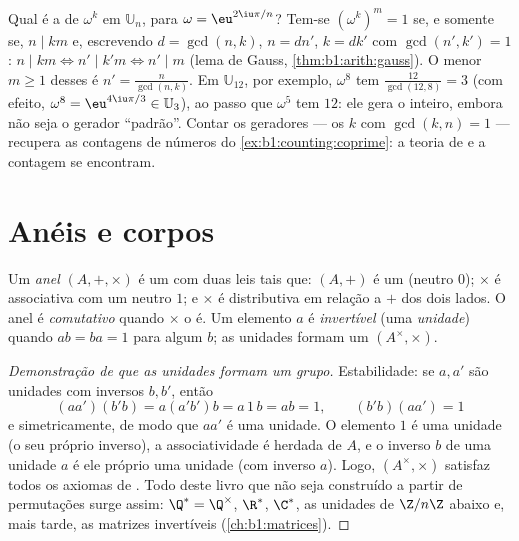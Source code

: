 \begin{example}\label{ex:b1:structures:orderU12}
Qual é a  de $\omega^k$ em $\mathbb U_n$, para $\omega =
\eu^{2\iu\pi/n}$? Tem-se $(\omega^k)^m = 1$ se, e somente se, $n \mid km$ e,
escrevendo $d = \gcd(n, k)$, $n = dn'$, $k = dk'$ com $\gcd(n', k')
= 1$: $n \mid km \iff n' \mid k'm \iff n' \mid m$ (lema de Gauss,
\cref{thm:b1:arith:gauss}). O menor $m \geq 1$ desses é
$n' = \frac{n}{\gcd(n,k)}$. Em $\mathbb U_{12}$, por exemplo,
$\omega^8$ tem  $\frac{12}{\gcd(12,8)} = 3$ (com efeito,
$\omega^8 = \eu^{4\iu\pi/3} \in \mathbb U_3$), ao passo que $\omega^5$
tem  $12$: ele gera o  inteiro, embora não seja
o gerador ``padrão''. Contar os geradores --- os $k$
com $\gcd(k, n) = 1$ --- recupera as contagens de números  do \cref{ex:b1:counting:coprime}: a teoria de  e a contagem se encontram.
\end{example}

\section{Anéis e corpos}

\begin{definition}[Anel]\label{def:b1:structures:ring}
Um \emph{anel} $(A, +, \times)$ é um  com duas leis tais
que: $(A, +)$ é um  (neutro $0$); $\times$ é
associativa com um neutro $1$; e $\times$ é distributiva em relação a $+$
dos dois lados. O anel é \emph{comutativo} quando $\times$ o é. Um
elemento $a$ é \emph{invertível} (uma \emph{unidade}) quando $ab = ba = 1$
para algum $b$; as unidades formam um  $(A^\times, \times)$.
\end{definition}

\begin{proof}[Demonstração de que as unidades formam um grupo]
Estabilidade: se $a, a'$ são unidades com inversos $b, b'$, então
\[
(aa')(b'b) = a(a'b')b = a\,1\,b = ab = 1,
\qquad (b'b)(aa') = 1
\]
e simetricamente, de modo que $aa'$ é uma unidade. O elemento $1$ é uma
unidade (o seu próprio inverso), a associatividade é herdada de $A$, e o
inverso $b$ de uma unidade $a$ é ele próprio uma unidade (com inverso
$a$). Logo, $(A^\times, \times)$ satisfaz todos os axiomas de . Todo 
deste livro que não seja construído a partir de permutações surge assim:
$\Q^* = \Q^\times$, $\R^*$, $\C^*$, as unidades de $\Z/n\Z$ abaixo
e, mais tarde, as matrizes invertíveis (\cref{ch:b1:matrices}).
\end{proof}

